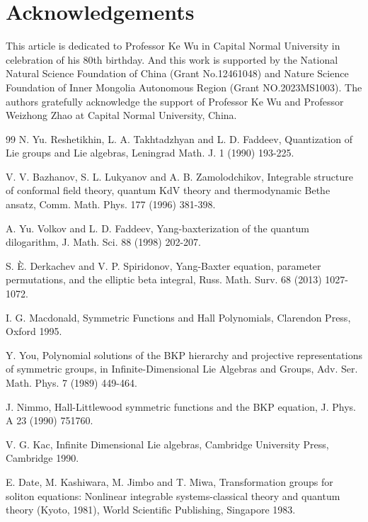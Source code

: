 \documentclass[11pt,reqno]{amsart}
\numberwithin{equation}{section}
\begin{document}
	
	\section{Acknowledgements}
	This article is dedicated to Professor Ke Wu in Capital Normal University in celebration of his 80th birthday. And this work is supported by the National Natural Science Foundation of China (Grant No.12461048) and Nature Science Foundation of Inner Mongolia Autonomous Region (Grant NO.2023MS1003). The authors gratefully acknowledge the support of Professor Ke Wu and Professor Weizhong Zhao at Capital Normal University, China.
	



	\begin{thebibliography}{99}
		N. Yu. Reshetikhin, L. A. Takhtadzhyan and L. D. Faddeev, Quantization of Lie groups and Lie algebras, Leningrad Math. J. 1 (1990) 193-225.
		
		V. V. Bazhanov, S. L. Lukyanov and A. B. Zamolodchikov, Integrable structure of conformal field theory, quantum KdV theory and thermodynamic Bethe ansatz, Comm. Math. Phys. 177 (1996) 381-398.
		
		A. Yu. Volkov and L. D. Faddeev, Yang-baxterization of the quantum dilogarithm, J. Math. Sci. 88 (1998) 202-207.
		
		S. \`{E}. Derkachev and V. P. Spiridonov, Yang-Baxter equation, parameter permutations, and the elliptic beta integral, Russ. Math. Surv. 68 (2013) 1027-1072.
		
		I. G. Macdonald, Symmetric Functions and Hall Polynomials, Clarendon Press, Oxford 1995.
		
		Y. You, Polynomial solutions of the BKP hierarchy and projective representations of symmetric groups, in Infinite-Dimensional Lie Algebras and Groups, Adv. Ser. Math. Phys. 7 (1989) 449-464.
		
		 J. Nimmo, Hall-Littlewood symmetric functions and the BKP equation, J. Phys. A 23 (1990) 751760.
		
		V. G. Kac, Infinite Dimensional Lie algebras, Cambridge University Press, Cambridge 1990.
		
		 E. Date, M. Kashiwara, M. Jimbo and T. Miwa, Transformation groups for soliton equations: Nonlinear integrable systems-classical theory and quantum theory (Kyoto, 1981), World Scientific Publishing, Singapore 1983.
		

\end{thebibliography}
\end{document}
